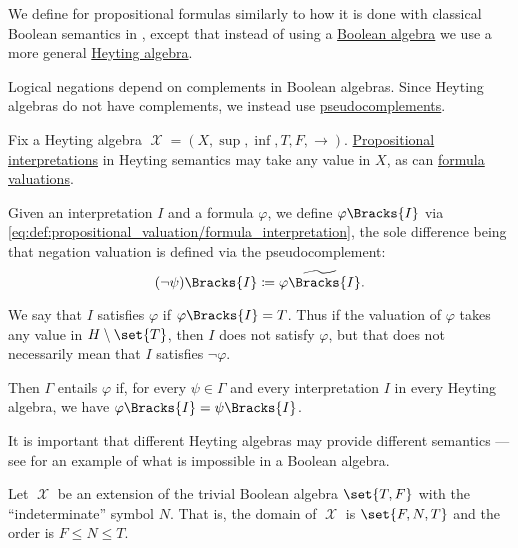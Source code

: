 \begin{proposition}
\begin{proposition}
\begin{definition}\label{def:propositional_heyting_algebra_semantics}
  We define  for propositional formulas similarly to how it is done with classical Boolean semantics in , except that instead of using a \hyperref[def:boolean_algebra]{Boolean algebra} we use a more general \hyperref[def:heyting_algebra]{Heyting algebra}.

  Logical negations depend on complements in Boolean algebras. Since Heyting algebras do not have complements, we instead use \hyperref[def:heyting_algebra/pseudocomplement]{pseudocomplements}.

  Fix a Heyting algebra \( \mscrX = (X, \sup, \inf, T, F, \rightarrow) \). \hyperref[def:propositional_valuation/interpretation]{Propositional interpretations} in Heyting semantics may take any value in \( X \), as can \hyperref[def:propositional_valuation/formula_valuation]{formula valuations}.

  Given an interpretation \( I \) and a formula \( \varphi \), we define \( \varphi\Bracks{I} \) via \eqref{eq:def:propositional_valuation/formula_interpretation}, the sole difference being that negation valuation is defined via the pseudocomplement:
  \begin{equation*}
    (\neg \psi)\Bracks{I} \coloneqq \widetilde{\varphi\Bracks{I}}.
  \end{equation*}

  We say that \( I \) satisfies \( \varphi \) if \( \varphi\Bracks{I} = T \). Thus if the valuation of \( \varphi \) takes any value in \( H \setminus \set{ T } \), then \( I \) does not satisfy \( \varphi \), but that does not necessarily mean that \( I \) satisfies \( \neg \varphi \).

  Then \( \Gamma \) entails \( \varphi \) if, for every \( \psi \in \Gamma \) and every interpretation \( I \) in every Heyting algebra, we have \( \varphi\Bracks{I} = \psi\Bracks{I} \).

  It is important that different Heyting algebras may provide different semantics --- see  for an example of what is impossible in a Boolean algebra.
\end{definition}

\begin{example}\label{ex:heyting_semantics_lem_counterexample}
  Let \( \mscrX \) be an extension of the trivial Boolean algebra \( \set{ T, F } \) with the \enquote{indeterminate} symbol \( N \). That is, the domain of \( \mscrX \) is \( \set{ F, N, T } \) and the order is \( F \leq N \leq T \).


\end{example}
\end{proposition}
\end{proposition}
